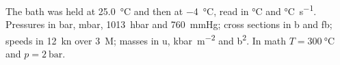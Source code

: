 \documentclass{article}
\begin{document}
The bath was held at \SI{25.0}{\celsius} and then at \qty{-4}{\celsius}, read in \si{\celsius} and \unit{\celsius\per\second}.
Pressures in \si{\bar}, \si{\milli\bar}, \SI{1013}{\hecto\bar} and \SI{760}{\mmHg}; cross sections in \si{\barn}
and \si{\femto\barn}; speeds in \SI{12}{\knot} over \SI{3}{\nauticalmile}; masses in \si{\atomicmassunit},
\si{\kilo\bar\per\square\metre} and \si{\barn\squared}.
In math $T = \SI{300}{\celsius}$ and $p = \SI{2}{\bar}$.
\end{document}
